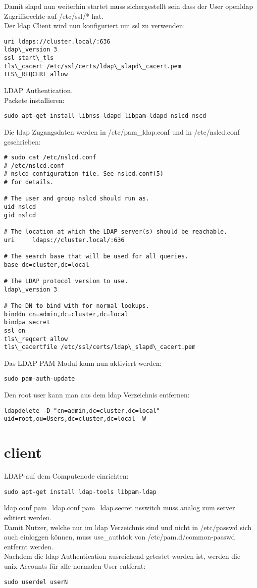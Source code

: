 Damit slapd nun weiterhin startet muss sichergestellt sein dass der User openldap Zugriffsrechte auf /etc/ssl/* hat.\\
Der ldap Client wird nun konfiguriert um ssl zu verwenden:
\begin{lstlisting}[style=Bash]
uri ldaps://cluster.local/:636
ldap\_version 3
ssl start\_tls
tls\_cacert /etc/ssl/certs/ldap\_slapd\_cacert.pem
TLS\_REQCERT allow
\end{lstlisting}
LDAP Authentication.\\
Packete installieren:
\begin{lstlisting}[style=Bash]
sudo apt-get install libnss-ldapd libpam-ldapd nslcd nscd
\end{lstlisting}
Die ldap Zugangsdaten werden in /etc/pam\_ldap.conf und in /etc/nslcd.conf geschrieben:
\begin{lstlisting}[style=Bash]
# sudo cat /etc/nslcd.conf 
# /etc/nslcd.conf
# nslcd configuration file. See nslcd.conf(5)
# for details.

# The user and group nslcd should run as.
uid nslcd
gid nslcd

# The location at which the LDAP server(s) should be reachable.
uri     ldaps://cluster.local/:636

# The search base that will be used for all queries.
base dc=cluster,dc=local

# The LDAP protocol version to use.
ldap\_version 3

# The DN to bind with for normal lookups.
binddn cn=admin,dc=cluster,dc=local
bindpw secret
ssl on
tls\_reqcert allow
tls\_cacertfile /etc/ssl/certs/ldap\_slapd\_cacert.pem
\end{lstlisting}
Das LDAP-PAM Modul kann nun aktiviert werden: 
\begin{lstlisting}[style=Bash]
sudo pam-auth-update
\end{lstlisting}
Den root user kann man aus dem ldap Verzeichnis entfernen:
\begin{lstlisting}[style=Bash]
ldapdelete -D "cn=admin,dc=cluster,dc=local" uid=root,ou=Users,dc=cluster,dc=local -W
\end{lstlisting}
\section{client}
LDAP-auf dem Computenode einrichten:
\begin{lstlisting}[style=Bash]
sudo apt-get install ldap-tools libpam-ldap
\end{lstlisting}
{ldap.conf pam\_ldap.conf pam\_ldap.secret nsswitch} muss analog zum server editiert werden.\\
Damit Nutzer, welche nur im ldap Verzeichnis sind und nicht in /etc/passwd sich auch einloggen können, muss use\_authtok von /etc/pam.d/common-passwd entfernt werden.\\
Nachdem die ldap Authentication ausreichend getestet worden ist, werden die unix Accounts für alle normalen User entfernt: 
\begin{lstlisting}[style=Bash]
sudo userdel userN
\end{lstlisting}
